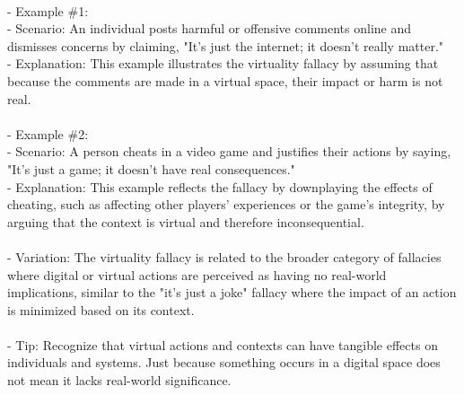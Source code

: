 \documentclass[a4paper,12pt,single,pdftex]{scrbook}
\begin{document}
    
      
    \\

    
      - Example \#1:
    \\

    
        - Scenario: An individual posts harmful or offensive comments online and dismisses concerns by claiming, "It’s just the internet; it doesn’t really matter."
    \\

    
        - Explanation: This example illustrates the virtuality fallacy by assuming that because the comments are made in a virtual space, their impact or harm is not real.
    \\

    
      
    \\

    
      - Example \#2:
    \\

    
        - Scenario: A person cheats in a video game and justifies their actions by saying, "It’s just a game; it doesn’t have real consequences."
    \\

    
        - Explanation: This example reflects the fallacy by downplaying the effects of cheating, such as affecting other players' experiences or the game's integrity, by arguing that the context is virtual and therefore inconsequential.
    \\

    
      
    \\

    
      - Variation: The virtuality fallacy is related to the broader category of fallacies where digital or virtual actions are perceived as having no real-world implications, similar to the "it’s just a joke" fallacy where the impact of an action is minimized based on its context.
    \\

    
      
    \\

    
      - Tip: Recognize that virtual actions and contexts can have tangible effects on individuals and systems. Just because something occurs in a digital space does not mean it lacks real-world significance.
    \\

    
      
\end{document}
